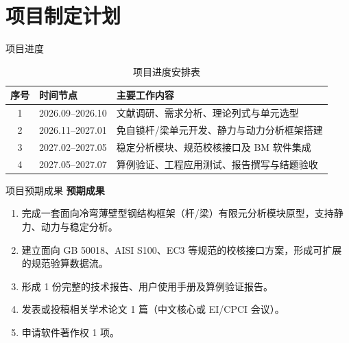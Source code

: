 \section{项目制定计划}
\begin{frame}{项目进度}
    \begin{table}
        \centering
        \caption{项目进度安排表}
        \vspace{0pt}
        \begin{tabular}{clp{9cm}}
            \toprule
            \textbf{序号} & \textbf{时间节点} & \textbf{主要工作内容} \\
            \midrule
            1 & 2026.09--2026.10 & 文献调研、需求分析、理论列式与单元选型 \\
            2 & 2026.11--2027.01 & 免自锁杆/梁单元开发、静力与动力分析框架搭建 \\
            3 & 2027.02--2027.05 & 稳定分析模块、规范校核接口及 BM 软件集成 \\
            4 & 2027.05--2027.07 & 算例验证、工程应用测试、报告撰写与结题验收 \\
            \bottomrule
        \end{tabular}
    \end{table}
\end{frame}

\begin{frame}{项目预期成果}
    \textbf{预期成果}
    \begin{enumerate}[1]
        \item 完成一套面向冷弯薄壁型钢结构框架（杆/梁）有限元分析模块原型，支持静力、动力与稳定分析。
        \item 建立面向 GB 50018、AISI S100、EC3 等规范的校核接口方案，形成可扩展的规范验算数据流。
        \item 形成 1 份完整的技术报告、用户使用手册及算例验证报告。
        \item 发表或投稿相关学术论文 1 篇（中文核心或 EI/CPCI 会议）。
        \item 申请软件著作权 1 项。
    \end{enumerate}
\end{frame}

